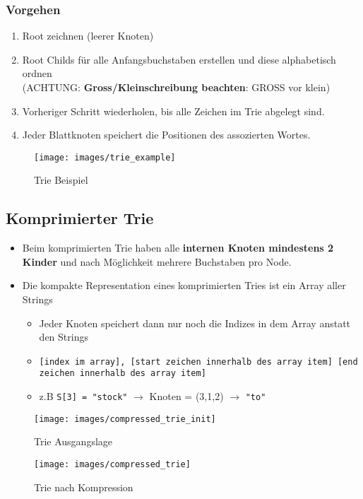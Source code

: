 \subsubsection{Vorgehen}
\begin{enumerate}
	\item Root zeichnen (leerer Knoten)
	\item Root Childs für alle Anfangsbuchstaben erstellen und diese alphabetisch ordnen \\ (ACHTUNG: \textbf{Gross/Kleinschreibung beachten}: GROSS vor klein)
	\item Vorheriger Schritt wiederholen, bis alle Zeichen im Trie abgelegt sind.
	\item Jeder Blattknoten speichert die Positionen des assozierten Wortes.
\end{enumerate}

\begin{figure}[h]
\centering
\texttt{[image: images/trie\_example]}
\caption{Trie Beispiel}
\label{fig:trieexample}
\end{figure}


\subsection{Komprimierter Trie}
\begin{itemize}
	\item Beim komprimierten Trie haben alle \textbf{internen Knoten mindestens 2 Kinder} und nach Möglichkeit mehrere Buchstaben pro Node.
	\item Die kompakte Representation eines komprimierten Tries ist ein Array aller Strings
	\begin{itemize}
		\item Jeder Knoten speichert dann nur noch die Indizes in dem Array anstatt den Strings
		\item \lstinline|[index im array], [start zeichen innerhalb des array item] [end zeichen innerhalb des array item]|
		\item z.B \lstinline|S[3] = "stock"| $\rightarrow$ Knoten = (3,1,2) $\rightarrow$ \lstinline|"to"|
	\end{itemize}
\end{itemize}
\begin{figure}[ht!]
	\centering
	\begin{minipage}[t]{0.4\textwidth}
		\centering
		\texttt{[image: images/compressed\_trie\_init]}
		\caption{Trie Ausgangslage}
		\label{fig:trieexample}
	\end{minipage}
	\begin{minipage}[t]{0.4\textwidth}
		\centering
		\texttt{[image: images/compressed\_trie]}
		\caption{Trie nach Kompression}
		\label{fig:searchtreeinsert2}
	\end{minipage}
\end{figure}


